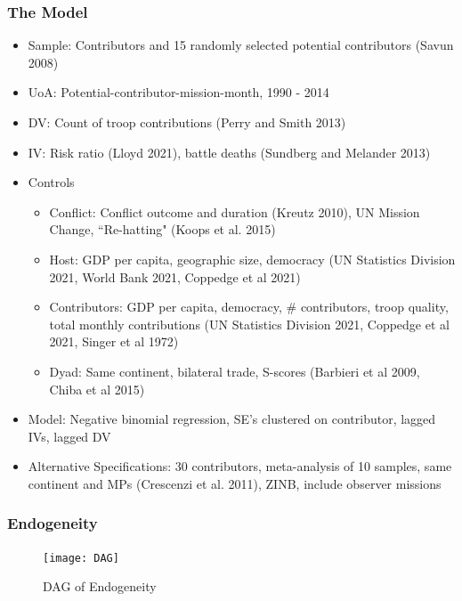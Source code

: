 \documentclass{beamer}
\begin{document}

\begin{frame}
\frametitle{The Model}

\begin{itemize}
  \pause
  \item \scriptsize Sample: Contributors and 15 randomly selected potential contributors {\tiny (Savun 2008)}
  \item \scriptsize UoA: Potential-contributor-mission-month, 1990 - 2014
  \pause
  \item \scriptsize DV: Count of troop contributions {\tiny (Perry and Smith 2013)}
  \item \scriptsize IV: Risk ratio {\tiny (Lloyd 2021)}, battle deaths {\tiny (Sundberg and Melander 2013)} 
  \pause
  \item \scriptsize Controls
  \begin{itemize}
    \item \scriptsize Conflict: Conflict outcome and duration {\tiny (Kreutz 2010)}, UN Mission Change, ``Re-hatting" {\tiny (Koops et al. 2015)}
    \item \scriptsize Host: GDP per capita, geographic size, democracy {\tiny (UN Statistics Division 2021, World Bank 2021, Coppedge et al 2021)}
    \item \scriptsize Contributors: GDP per capita, democracy, \# contributors, troop quality, total monthly contributions {\tiny (UN Statistics Division 2021, Coppedge et al 2021, Singer et al 1972)}
    \item \scriptsize Dyad: Same continent, bilateral trade, S-scores {\tiny (Barbieri et al 2009, Chiba et al 2015)}
  \end{itemize}
    \pause
  \item \scriptsize Model: Negative binomial regression, SE's clustered on contributor, lagged IVs, lagged DV
  \item \scriptsize Alternative Specifications: 30 contributors, meta-analysis of 10 samples, same continent and MPs {\tiny (Crescenzi et al. 2011)}, ZINB, include observer missions
\end{itemize}

\end{frame}


\begin{frame}
\frametitle{Endogeneity}

\begin{figure}[t]
\centering
\texttt{[image: DAG]}
\caption{\scriptsize DAG of Endogeneity}
\label{DAG}
\end{figure}

\end{frame}
\end{document}
